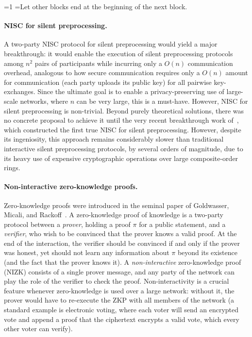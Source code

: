\documentclass[oneside, a4paper, onecolumn, 11pt]{article}
\newcounter{alphasect}
\def\alphainsection{0}
\newenvironment{alphasection}{%
  \ifnum\alphainsection=1%
    \errhelp={Let other blocks end at the beginning of the next block.}
    \errmessage{Nested Alpha section not allowed}
  \fi%
  \setcounter{alphasect}{0}
  \def\alphainsection{1}
}{%
  \setcounter{alphasect}{0}
  \def\alphainsection{0}
}%
\begin{document}
\begin{alphasection}
\paragraph{NISC for silent preprocessing.} A two-party NISC protocol for silent preprocessing would yield a major breakthrough: it would enable the execution of silent preprocessing protocols among $n^2$ pairs of participants while incurring only a $O(n)$ communication overhead, analogous to how secure communication requires only a $O(n)$ amount for communication (each party uploads its public key) for all pairwise key-exchanges. Since the ultimate goal is to enable a privacy-preserving use of large-scale networks, where $n$ can be very large, this is a must-have. However, NISC for silent preprocessing is non-trivial. Beyond purely theoretical solutions, there was no concrete proposal to achieve it until the very recent breakthrough work of~\cite{EC:OrlSchYak21}, which constructed the first true NISC for silent preprocessing. However, despite its ingeniosity, this approach remains considerably slower than traditional interactive silent preprocessing protocols, by several orders of magnitude, due to its heavy use of expensive cryptographic operations over large composite-order rings.

\paragraph{Non-interactive zero-knowledge proofs.} Zero-knowledge proofs were introduced in the seminal paper of Goldwasser, Micali, and Rackoff~\cite{GolMicRac89}. A zero-knowledge proof of knowledge is a two-party protocol between a \emph{prover}, holding a proof $\pi$ for a public statement, and a \emph{verifier}, who wish to be convinced that the prover knows a valid proof. At the end of the interaction, the verifier should be convinced if and only if the prover was honest, yet should not learn any information about $\pi$ beyond its existence (and the fact that the prover knows it). A \emph{non-interactive} zero-knowledge proof~\cite{STOC:BluFelMic88} (NIZK) consists of a single prover message, and any party of the network can play the role of the verifier to check the proof. Non-interactivity is a crucial feature whenever zero-knowledge is used over a large network: without it, the prover would have to re-execute the ZKP with all members of the network (a standard example is electronic voting, where each voter will send an encrypted vote and append a proof that the ciphertext encrypts a valid vote, which every other voter can verify).


\end{alphasection}
\end{document}
